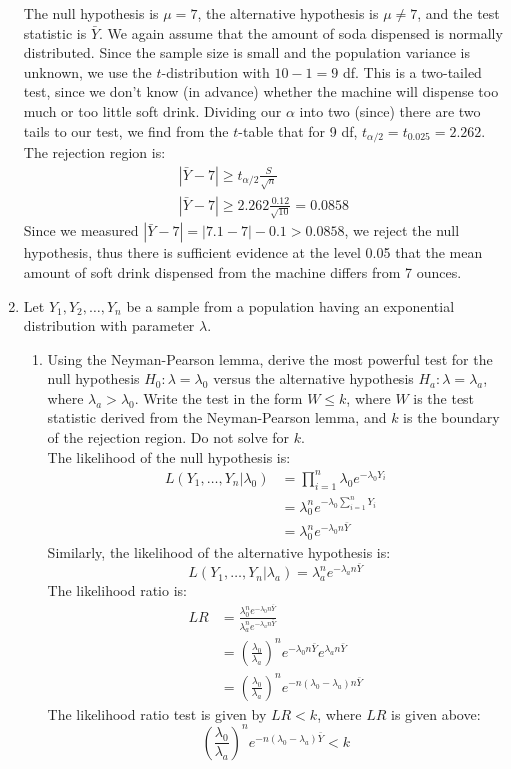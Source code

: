 \documentclass[12pt]{article}
\begin{document}
\begin{enumerate}
The null hypothesis is $\mu = 7$, the alternative hypothesis is $\mu \neq 7$, and the test statistic is $\bar{Y}$. We again assume that the amount of soda dispensed is normally distributed. Since the sample size is small and the population variance is unknown, we use the $t$-distribution with $10 - 1 = 9$ df. This is a two-tailed test, since we don't know (in advance) whether the machine will dispense too much or too little soft drink. Dividing our $\alpha$ into two (since) there are two tails to our test, we find from the $t$-table that for 9 df, $t_{\alpha/2} = t_{0.025} = 2.262$. The rejection region is:
\begin{align*}
|\bar{Y} - 7| \geq t_{\alpha/2} \frac{S}{\sqrt{n}} \\
|\bar{Y} - 7| \geq 2.262 \frac{0.12}{\sqrt{10}} = 0.0858
\end{align*}
Since we measured $|\bar{Y} - 7| = |7.1 - 7| - 0.1 > 0.0858$, we reject the null hypothesis, thus there is sufficient evidence at the level 0.05 that the mean amount of soft drink dispensed from the machine differs from 7 ounces.

\item Let $Y_1, Y_2, \dots, Y_n$ be a sample from a population having an exponential distribution with parameter $\lambda$.
\begin{enumerate}
\item Using the Neyman-Pearson lemma, derive the most powerful test for the null hypothesis $H_0: \lambda = \lambda_0$ versus the alternative hypothesis $H_a: \lambda = \lambda_a$, where $\lambda_a > \lambda_0$. Write the test in the form $W \leq k$, where $W$ is the test statistic derived from the Neyman-Pearson lemma, and $k$ is the boundary of the rejection region. Do not solve for $k$.\\

The likelihood of the null hypothesis is:
\begin{align*}
L(Y_1, \dots, Y_n | \lambda_0) &= \prod_{i=1}^n \lambda_0 e^{-\lambda_0 Y_i} \\
&= \lambda_0^n e^{-\lambda_0 \sum_{i=1}^n Y_i}\\
&= \lambda_0^n e^{-\lambda_0 n \bar{Y}}
\end{align*}
Similarly, the likelihood of the alternative hypothesis is:
\[
L(Y_1, \dots, Y_n | \lambda_a) = \lambda_a^n e^{-\lambda_a n \bar{Y}}
\]
The likelihood ratio is:
\begin{align*}
LR &= \frac{ \lambda_0^n e^{-\lambda_0 n \bar{Y}} }{ \lambda_a^n e^{-\lambda_a n \bar{Y}} } \\
&= \left( \frac{ \lambda_0 }{\lambda_a }\right)^n e^{-\lambda_0 n \bar{Y}} e^{\lambda_a n \bar{Y}} \\
&= \left( \frac{ \lambda_0 }{\lambda_a }\right)^n e^{-n (\lambda_0 - \lambda_a) n \bar{Y}}
\end{align*}
The likelihood ratio test is given by $LR < k$, where $LR$ is given above:
\[
\left( \frac{ \lambda_0 }{\lambda_a }\right)^n e^{-n (\lambda_0 - \lambda_a) \bar{Y}} < k
\]


\end{enumerate}
\end{enumerate}
\end{document}

